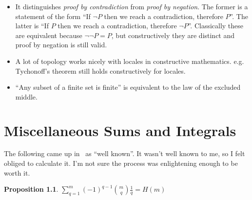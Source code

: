 \documentclass[a4paper]{book}
\newtheorem{proposition}{Proposition}[section]
\begin{document}
\begin{itemize}
\item It distinguishes \emph{proof by contradiction} from \emph{proof by negation}.
The former is a statement of the form ``If \(\lnot P\) then we reach a contradiction, therefore \(P\)''.
The latter is ``If \(P\) then we reach a contradiction, therefore \(\lnot P\)''.
Classically these are equivalent because \(\lnot \lnot P = P\),
but constructively they are distinct and proof by negation is still valid.
\item A lot of topology works nicely with locales in constructive mathematics.
e.g. Tychonoff's theorem still holds constructively for locales.
\item ``Any subset of a finite set is finite'' is equivalent to the law of the excluded middle.
\end{itemize}


\chapter{Miscellaneous Sums and Integrals}

The following came up in~\cite{DBLP:journals/dam/FlajoletGT92} as ``well known''.
It wasn't well known to me,
so I felt obliged to calculate it.
I'm not sure the process was enlightening enough to be worth it.

\begin{proposition}
\(\sum\limits_{q = 1}^m {(-1)}^{q - 1} {m \choose q} \frac{1}{q} = H(m)\)
\end{proposition}
\end{document}
